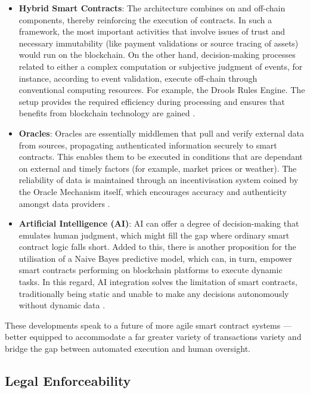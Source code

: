 \begin{itemize}
    \item \textbf{Hybrid Smart Contracts}:
    The architecture combines on and off-chain components, thereby reinforcing the execution of contracts. In such a framework, the most important activities that involve issues of trust and necessary immutability (like payment validations or source tracing of assets) would run on the blockchain. On the other hand, decision-making processes related to either a complex computation or subjective judgment of events, for instance, according to event validation, execute off-chain through conventional computing resources. For example, the Drools Rules Engine. The setup provides the required efficiency during processing and ensures that benefits from blockchain technology are gained \cite{SolaimanEtAl2021}.
    \item \textbf{Oracles}: Oracles are essentially middlemen that pull and verify external data from sources, propagating authenticated information securely to smart contracts. This enables them to be executed in conditions that are dependant on external and timely factors (for example, market prices or weather). The reliability of data is maintained through an incentivisation system coined by the Oracle Mechanism itself, which encourages accuracy and authenticity amongst data providers \cite{WangEtAl2020}.
    \item \textbf{Artificial Intelligence (AI)}: 
    AI can offer a degree of decision-making that emulates human judgment, which might fill the gap where ordinary smart contract logic falls short. Added to this, there is another proposition for the utilisation of a Naive Bayes predictive model, which can, in turn, empower smart contracts performing on blockchain platforms to execute dynamic tasks. In this regard, AI integration solves the limitation of smart contracts, traditionally being static and unable to make any decisions autonomously without dynamic data \cite{BadruddojaEtAl2021}.
\end{itemize}

These developments speak to a future of more agile smart contract systems — better equipped to accommodate a far greater variety of transactions variety and bridge the gap between automated execution and human oversight.

\subsection{Legal Enforceability}

